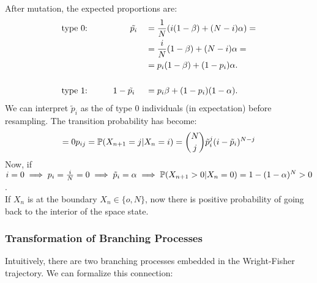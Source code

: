 \documentclass{article}
\begin{document}
	After mutation, the expected proportions are:
	\begin{alignat*}{3}
		&\text{type 0:}&&\qquad \Tilde{p_i}&&=\frac{1}{N}(i(1-\beta)+(N-i)\alpha)=\\
		& && &&=\frac{i}{N}(1-\beta)+(N-i)\alpha=\\
		& && &&=p_i(1-\beta)+(1-p_i)\alpha.\\
		\\
		&\text{type 1:}\qquad &&1-\tilde{p_i}&&=p_i\beta+(1-p_i)(1-\alpha).
	\end{alignat*}
	We can interpret $\tilde{p}_i$ as the  of type 0 individuals (in expectation) before resampling. The transition probability has become:
	\[=0
	p_{ij}=\mathbb{P}(X_{n+1}=j|X_n=i)=\binom{N}{j}\Tilde{p}_i^j(i-\Tilde{p}_i)^{N-j}
	\]
	Now, if $i=0\implies p_i=\frac{i}{N}=0\implies\Tilde{p}_i=\alpha\implies\mathbb{P}(X_{n+1}>0|X_n=0)=1-(1-\alpha)^N>0$.\\
	If $X_n$ is at the boundary $X_n \in \{o,N\}$, now there is positive probability of going back to the interior of the space state.
	\subsubsection*{Transformation of Branching Processes}
	Intuitively, there are two branching processes embedded in the Wright-Fisher trajectory. We can formalize this connection:
	
\end{document}
